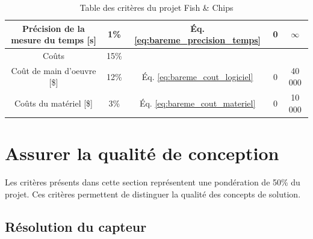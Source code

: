 \begin{table}[htp]
{\begin{tabular}{|c|c|c|c|c|}
        Précision de la mesure du temps [s] & 1\% & Éq. \ref{eq:bareme_precision_temps} & 0 & $\infty$\\
        \hline\hline
        Coûts & 15\% & & &\\
        \hline
        Coût de main d'oeuvre [\$] & 12\% & Éq. \ref{eq:bareme_cout_logiciel} & 0 & 40 000\\
        Coûts du matériel [\$] & 3\% & Éq. \ref{eq:bareme_cout_materiel} & 0 & 10 000 \\
        \hline
   \end{tabular}}
    \caption{Table des critères du projet Fish \& Chips}
    \label{t:criteres}
\end{table}



\newpage{}

\section{Assurer la qualité de conception}
Les critères présents dans cette section représentent une pondération de 50\% du projet. Ces critères permettent de distinguer la qualité des concepts de solution.  

\subsection{Résolution du capteur}


